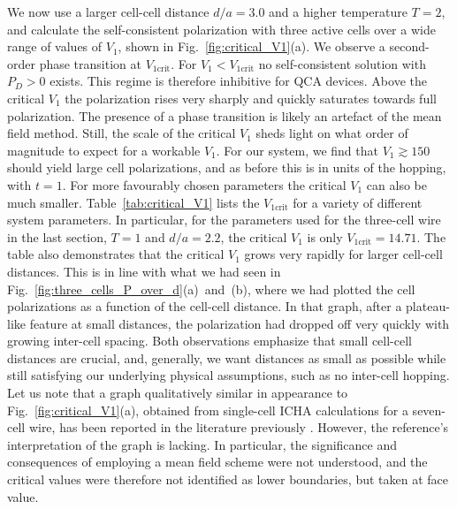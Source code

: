 We now use a larger cell-cell distance $d/a = 3.0$ and a higher temperature $T =
2$, and calculate the self-consistent polarization with three active cells over
a wide range of values of $V_1$, shown in Fig.~\ref{fig:critical_V1}(a). We
observe a second-order phase transition at $V_{1\textrm{crit}}$. For $V_1 <
V_{1\textrm{crit}}$ no self-consistent solution with $P_D > 0 $ exists. This
regime is therefore inhibitive for QCA devices. Above the critical $V_1$ the
polarization rises very sharply and quickly saturates towards full polarization.
The presence of a phase transition is likely an artefact of the mean field
method. Still, the scale of the critical $V_1$ sheds light on what order of
magnitude to expect for a workable $V_1$. For our system, we find that $V_1
\gtrsim 150$ should yield large cell polarizations, and as before this is in
units of the hopping, with $t = 1$. For more favourably chosen parameters the
critical $V_1$ can also be much smaller. Table~\ref{tab:critical_V1} lists the
$V_{1\textrm{crit}}$ for a variety of different system parameters. In
particular, for the parameters used for the three-cell wire in the last section,
$T = 1$ and $d/a = 2.2$, the critical $V_1$ is only $V_{1\textrm{crit}} =
14.71$. The table also demonstrates that the critical $V_1$ grows very rapidly
for larger cell-cell distances. This is in line with what we had seen in
Fig.~\ref{fig:three_cells_P_over_d}(a)~and~(b), where we had plotted the cell
polarizations as a function of the cell-cell distance. In that graph, after a
plateau-like feature at small distances, the polarization had dropped off very
quickly with growing inter-cell spacing. Both observations emphasize that small
cell-cell distances are crucial, and, generally, we want distances as small as
possible while still satisfying our underlying physical assumptions, such as no
inter-cell hopping. Let us note that a graph qualitatively similar in appearance
to Fig.~\ref{fig:critical_V1}(a), obtained from single-cell ICHA calculations
for a seven-cell wire, has been reported in the literature previously
\cite{lent1993lines}. However, the reference's interpretation of the graph is
lacking. In particular, the significance and consequences of employing a mean
field scheme were not understood, and the critical values were therefore not
identified as lower boundaries, but taken at face value.

